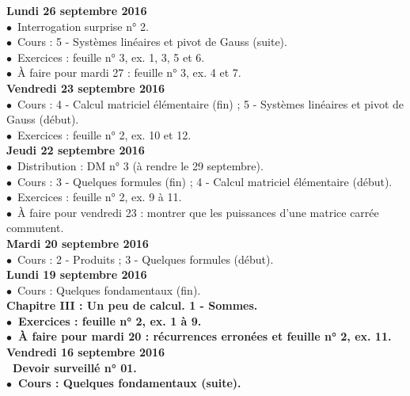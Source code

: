 \documentclass[12pt,a4paper]{article}
\begin{document}
\noindent\textbf{Lundi 26 septembre 2016 }\\
$\bullet$\ Interrogation surprise n° 2.\\
$\bullet$\ Cours : 5 - Systèmes linéaires et pivot de Gauss (suite).\\
$\bullet$\ Exercices : feuille n° 3, ex. 1, 3, 5 et 6.\\
$\bullet$\ À faire pour mardi 27 : feuille n° 3, ex. 4 et 7.\vspace{.4cm}\\

\noindent\textbf{Vendredi 23 septembre 2016 }\\
$\bullet$\ Cours : 4 - Calcul matriciel élémentaire (fin) ; 5 - Systèmes linéaires et pivot de Gauss (début).\\
$\bullet$\ Exercices : feuille n° 2, ex. 10 et 12.\vspace{.4cm}\\

\noindent\textbf{Jeudi 22 septembre 2016 }\\
$\bullet$\ Distribution : DM n° 3 (à rendre le 29 septembre).\\
$\bullet$\ Cours : 3 - Quelques formules (fin) ; 4 - Calcul matriciel
élémentaire (début).\\
$\bullet$\ Exercices : feuille n° 2, ex. 9 à 11.\\
$\bullet$\ À faire pour vendredi 23 : montrer que les puissances d'une matrice carrée commutent.\vspace{.4cm}\\

\noindent\textbf{\bf Mardi 20 septembre 2016 }\\
$\bullet$\ Cours : 2 - Produits ; 3 - Quelques formules (début).\vspace{.4cm}\\

\noindent\textbf{Lundi 19 septembre 2016 }\\
$\bullet$\ Cours : Quelques fondamentaux (fin).\\
\bf Chapitre III \rm : Un peu de calcul. 1 - Sommes.\\
$\bullet$\ Exercices : feuille n° 2, ex. 1 à 9.\\
$\bullet$\ À faire pour mardi 20 : récurrences erronées et feuille n° 2, ex. 11.\vspace{.4cm}\\

\noindent\textbf{Vendredi 16 septembre 2016 }\\
\bu\ Devoir surveillé n° 01.\\
$\bullet$\ Cours : Quelques fondamentaux (suite).\vspace{.4cm}\\
\end{document}
